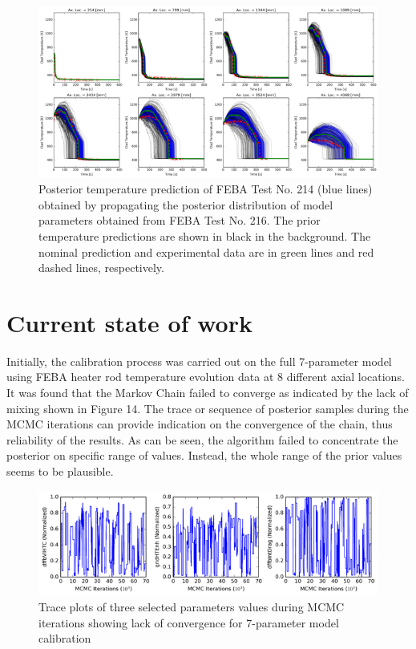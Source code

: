 \documentclass[11pt,titlepage]{article}
\begin{document}
\begin{figure}[h!]
	\centering
	\includegraphics[scale=0.95]{figures/uqrun.png}
	\caption{Posterior temperature prediction of FEBA Test No. 214 (blue lines)
	    obtained by propagating the posterior distribution of model parameters
	    obtained from FEBA Test No. 216. The prior temperature predictions are 
	    shown in black in the background. The nominal prediction and 
	    experimental data are in green lines and red dashed lines, respectively.}
	\label{fig:uqrun}
\end{figure}


\section{Current state of work}

Initially, the calibration process was carried out on the full 7-parameter 
model using FEBA heater rod temperature evolution data at 8 different axial 
locations. 
It was found that the Markov Chain failed to converge as indicated by the 
lack of mixing shown in Figure 14. 
The trace or sequence of posterior samples during the MCMC iterations can 
provide indication on the convergence of the chain, thus reliability of the 
results. As can be seen, the algorithm failed to concentrate the posterior 
on specific range of values. 
Instead, the whole range of the prior values seems to be plausible.

\begin{figure}[h!]
	\centering
	\includegraphics[scale=0.95]{figures/nonconv.png}
	\caption{Trace plots of three selected parameters values during 
	    MCMC iterations showing lack of convergence for 7-parameter
	    model calibration}
	\label{fig:nonconv}
\end{figure}
\end{document}
